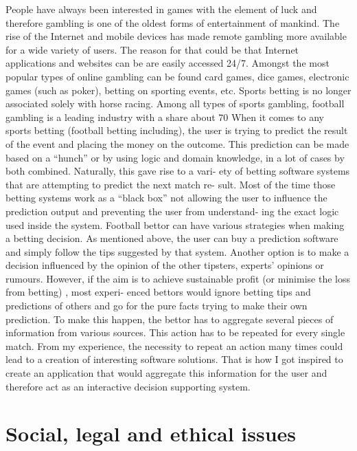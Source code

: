 People have always been interested in games with the element of luck and therefore gambling is one of the oldest forms of entertainment of mankind. The rise of the Internet and mobile devices has made remote gambling more available for a wide variety of users. The reason for that could be that Internet applications and websites can be are easily accessed 24/7. Amongst the most popular types of online gambling can be found card games, dice games, electronic games (such as poker), betting on sporting events, etc.
Sports betting is no longer associated solely with horse racing. Among all types of sports gambling, football gambling is a leading industry with a share about 70%
When it comes to any sports betting (football betting including), the user is trying to predict the result of the event and placing the money on the outcome. This prediction can be made based on a “hunch” or by using logic and domain knowledge, in a lot of cases by both combined. Naturally, this gave rise to a vari- ety of betting software systems that are attempting to predict the next match re- sult. Most of the time those betting systems work as a “black box” not allowing the user to influence the prediction output and preventing the user from understand- ing the exact logic used inside the system.
Football bettor can have various strategies when making a betting decision. As mentioned above, the user can buy a prediction software and simply follow the tips suggested by that system. Another option is to make a decision influenced by the opinion of the other tipsters, experts’ opinions or rumours. However, if the aim is to achieve sustainable profit (or minimise the loss from betting) , most experi- enced bettors would ignore betting tips and predictions of others and go for the pure facts trying to make their own prediction. To make this happen, the bettor has to aggregate several pieces of information from various sources. This action has to be repeated for every single match.
From my experience, the necessity to repeat an action many times could lead to a creation of interesting software solutions. That is how I got inspired to create an application that would aggregate this information for the user and therefore act as an interactive decision supporting system.


\section{Social, legal and ethical issues}
\label{sociallegalethicalissues_back}

